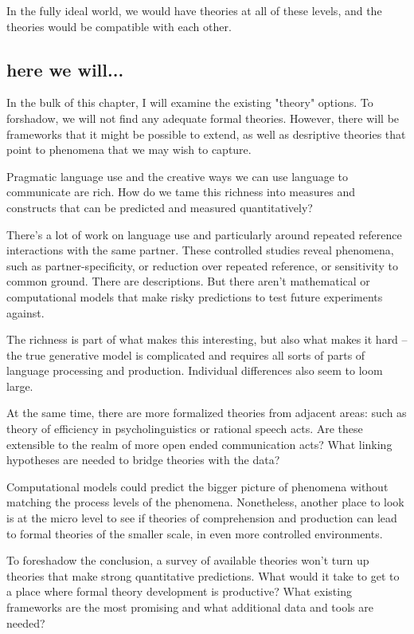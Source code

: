 \documentclass[]{article}
\begin{document}
	In the fully ideal world, we would have theories at all of these levels, and the theories would be compatible with each other. 
	
\subsection{here we will...} 
	
	In the bulk of this chapter, I will examine the existing "theory" options. To forshadow, we will not find any adequate formal theories. However, there will be frameworks that it might be possible to extend, as well as desriptive theories that point to phenomena that we may wish to capture. 
	
Pragmatic language use and the creative ways we can use language to communicate are rich. How do we tame this richness into measures and constructs that can be predicted and measured quantitatively? 

There's a lot of work on language use and particularly around repeated reference interactions with the same partner. These controlled studies reveal phenomena, such as partner-specificity, or reduction over repeated reference, or sensitivity to common ground. There are descriptions. But there aren't mathematical or computational models that make risky predictions to test future experiments against. 
	
The richness is part of what makes this interesting, but also what makes it hard -- the true generative model is complicated and requires all sorts of parts of language processing and production. Individual differences also seem to loom large. 

At the same time, there are more formalized theories from adjacent areas: such as theory of efficiency in psycholinguistics or rational speech acts. Are these extensible to the realm of more open ended communication acts? What linking hypotheses are needed to bridge theories with the data? 

Computational models could predict the bigger picture of phenomena without matching the process levels of the phenomena. Nonetheless, another place to look is at the micro level to see if theories of comprehension and production can lead to formal theories of the smaller scale, in even more controlled environments. 

To foreshadow the conclusion, a survey of available theories won't turn up theories that make strong quantitative predictions. What would it take to get to a place where formal theory development is productive? What existing frameworks are the most promising and what additional data and tools are needed? 
\end{document}
